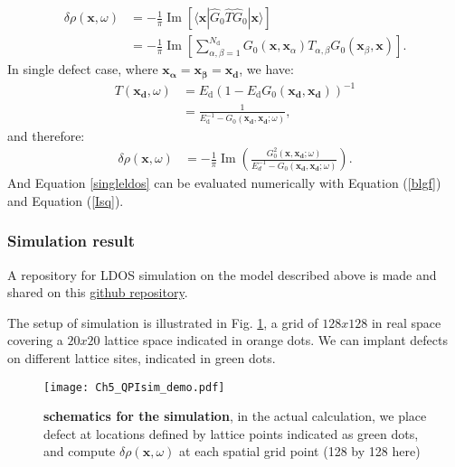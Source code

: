 \begin{align}
	\delta\rho(\mathbf{x},\omega) &= - \frac{1}{\pi} \operatorname{Im} \left[ \langle \mathbf{x} | \hat{G}_0 \hat{T} \hat{G}_0 | \mathbf{x} \rangle \right] \\
	&= -\frac{1}{\pi} \operatorname{Im} \left[\sum_{\alpha, \beta=1}^{N_{\text{d}}} G_0(\mathbf{x}, \mathbf{x}_\alpha) T_{\alpha, \beta} G_0(\mathbf{x}_\beta, \mathbf{x})\right]. \label{multi_defect_eq}
\end{align}
In single defect case, where $\mathbf{x_\alpha} = \mathbf{x_\beta} = \mathbf{x_d}$, we have: 
\begin{align}
	T(\mathbf{x_d},\omega) &= E_{\text{d}} \left( 1 - E_{\text{d}} G_0(\mathbf{x_d}, \mathbf{x_d}) \right)^{-1} \label{T_matrix_ele} \\
	&= \frac{1}{E_{\text{d}}^{-1} - G_0(\mathbf{x_d}, \mathbf{x_d}; \omega)},
\end{align}
and therefore: 
\begin{align}
	\delta\rho(\mathbf{x},\omega) &= - \frac{1}{\pi} \operatorname{Im}(\frac{G_0^2(\mathbf{x},\mathbf{x_d};\omega)}{E_d^{-1} - G_0(\mathbf{x_d},\mathbf{x_d};\omega)}) \label{singleldos}. 
\end{align}
And Equation \ref{singleldos} can be evaluated numerically with Equation (\ref{blgf}) and Equation (\ref{Isq}).

\subsubsection{Simulation result}
A repository for \ac{LDOS} simulation on the model described above is made and shared on this \href{https://github.com/Plswearpants/QPI\_simulation}{github repository}.

The setup of simulation is illustrated in Fig. \ref{fig:ch5_qpisim_demo}, a grid of $128x128$ in real space covering a $20x20$ lattice space indicated in orange dots. We can implant defects on different lattice sites, indicated in green dots. 

\begin{figure}
	\centering
	\texttt{[image: Ch5\_QPIsim\_demo.pdf]}
	\caption[\textbf{schematics for the simulation}]{\textbf{schematics for the simulation}, in the actual calculation, we place defect at locations defined by lattice points indicated as green dots, and compute $\delta\rho(\textbf{x},\omega)$ at each spatial grid point (128 by 128 here)}
	\label{fig:ch5_qpisim_demo}
\end{figure}

